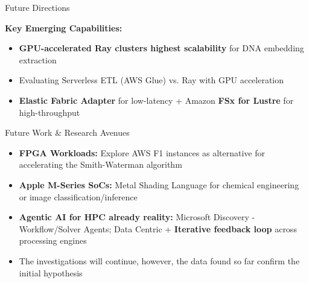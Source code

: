 \documentclass[aspectratio=169]{beamer}
\begin{document}
\begin{frame}{Future Directions}

            \textbf{Key Emerging Capabilities:}
            \begin{itemize}

                \item \textcolor{rayblue}{\textbf{GPU-accelerated Ray clusters highest scalability}} for DNA embedding extraction
                \item Evaluating Serverless ETL (AWS Glue) vs. Ray with GPU acceleration
                \item \textbf{Elastic Fabric Adapter} for low-latency + Amazon \textbf{FSx for Lustre} for high-throughput
            \end{itemize}

    
    \vspace{0.3cm}
    \begin{block}{Future Work \& Research Avenues}
        \begin{itemize}
            \item \textbf{FPGA Workloads:} Explore AWS F1 instances as alternative for accelerating the Smith-Waterman algorithm
            \item \textbf{Apple M-Series SoCs:} Metal Shading Language for chemical engineering or image classification/inference
            \item \textbf{Agentic AI for HPC already reality:} Microsoft Discovery - Workflow/Solver Agents; Data Centric + \textbf{Iterative feedback loop} across processing engines
            \item The investigations will continue, however, the data found so far confirm the initial hypothesis
        \end{itemize}
    \end{block}
\end{frame}
\end{document}
